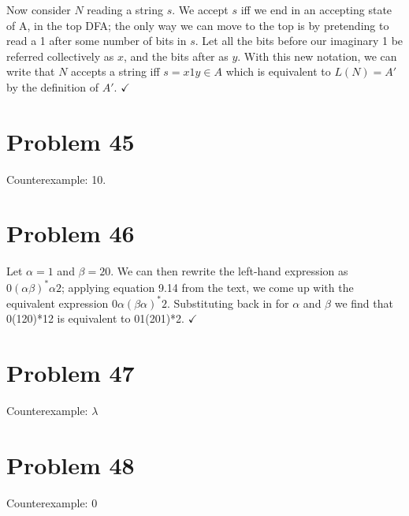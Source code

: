 \documentclass[11pt]{article}
\begin{document}
Now consider $N$ reading a string $s$. We accept $s$ iff we end in an accepting state of A, in the top DFA; the only way we can move to the top is by pretending to read a 1 after some number of bits in $s$. Let all the bits before our imaginary 1 be referred collectively as $x$, and the bits after as $y$. With this new notation, we can write that $N$ accepts a string iff $ s = x1y \in A$ which is equivalent to $L(N) = A'$ by the definition of $A'$. $\checkmark$

\section*{Problem 45}

Counterexample: 10.

\section*{Problem 46}

Let $\alpha = 1$ and $\beta = 20$. We can then rewrite the left-hand expression as $0(\alpha \beta)^*\alpha2$; applying equation 9.14 from the text, we come up with the equivalent expression 
$0\alpha(\beta \alpha)^*2$. Substituting back in for $\alpha$ and $\beta$ we find that 0(120)*12 is equivalent to 01(201)*2. $ \checkmark $


\section*{Problem 47}

Counterexample: $\lambda$

\section*{Problem 48}

Counterexample: 0
\end{document}
